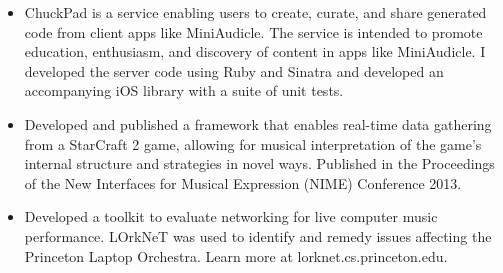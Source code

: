 

\begin{cvparagraph}
 
\vspace{2.0mm}

\begin{justify}
\begin{itemize}[leftmargin=2ex, nosep, noitemsep]
    \setlength{\parskip}{0pt}
    \renewcommand{\labelitemi}{\bullet}
\vspace{-2.0mm}
\item ChuckPad is a service enabling users to create, curate, and share generated code from client apps like MiniAudicle.
The service is intended to promote education, enthusiasm, and discovery of content in apps like MiniAudicle.
I developed the server code using Ruby and Sinatra and developed an accompanying iOS library with a suite of unit tests. 
\end{itemize}
\end{justify}


\begin{justify}
\begin{itemize}[leftmargin=2ex, nosep, noitemsep]
    \setlength{\parskip}{0pt}
    \renewcommand{\labelitemi}{\bullet}
\vspace{-2.0mm}
\item Developed and published a framework that enables real-time data gathering from a StarCraft 2 game, allowing for musical interpretation of the game’s internal structure and strategies in novel ways.
Published in the Proceedings of the New Interfaces for Musical Expression (NIME) Conference 2013.
\end{itemize}
\end{justify}

\begin{justify}
\begin{itemize}[leftmargin=2ex, nosep, noitemsep]
    \setlength{\parskip}{0pt}
    \renewcommand{\labelitemi}{\bullet}
\vspace{-2.0mm}
\item Developed a toolkit to evaluate networking for live computer music performance.
LOrkNeT was used to identify and remedy issues affecting the Princeton Laptop Orchestra.
Learn more at lorknet.cs.princeton.edu.
\end{itemize}
\end{justify}


\end{cvparagraph}
